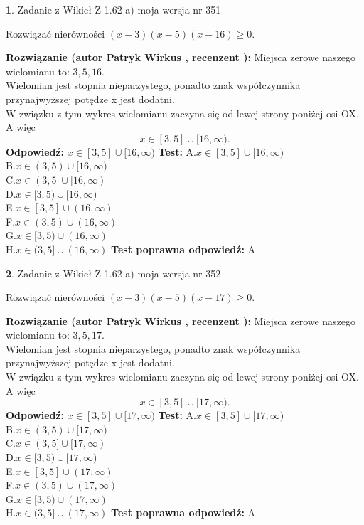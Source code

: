 \documentclass[12pt, a4paper]{article}
\theoremstyle{definition} %
\newtheorem{zad}{}
\newcommand{\zadStart}[1]{\begin{zad}#1\newline}
\newcommand{\zadStop}{\end{zad}}
\newcommand{\rozwStart}[2]{\noindent \textbf{Rozwiązanie (autor #1 , recenzent #2): }\newline}
\newcommand{\rozwStop}{\newline}
\newcommand{\odpStart}{\noindent \textbf{Odpowiedź:}\newline}
\newcommand{\odpStop}{\newline}
\newcommand{\testStart}{\noindent \textbf{Test:}\newline}
\newcommand{\testStop}{\newline}
\newcommand{\kluczStart}{\noindent \textbf{Test poprawna odpowiedź:}\newline}
\newcommand{\kluczStop}{\newline}
\begin{document}
\zadStart{Zadanie z Wikieł Z 1.62 a) moja wersja nr 351}

Rozwiązać nierówności $(x-3)(x-5)(x-16)\ge0$.
\zadStop
\rozwStart{Patryk Wirkus}{}
Miejsca zerowe naszego wielomianu to: $3, 5, 16$.\\
Wielomian jest stopnia nieparzystego, ponadto znak współczynnika przy\linebreak najwyższej potędze x jest dodatni.\\ W związku z tym wykres wielomianu zaczyna się od lewej strony poniżej osi OX. A więc $$x \in [3,5] \cup [16,\infty).$$
\rozwStop
\odpStart
$x \in [3,5] \cup [16,\infty)$
\odpStop
\testStart
A.$x \in [3,5] \cup [16,\infty)$\\
B.$x \in (3,5) \cup [16,\infty)$\\
C.$x \in (3,5] \cup [16,\infty)$\\
D.$x \in [3,5) \cup [16,\infty)$\\
E.$x \in [3,5] \cup (16,\infty)$\\
F.$x \in (3,5) \cup (16,\infty)$\\
G.$x \in [3,5) \cup (16,\infty)$\\
H.$x \in (3,5] \cup (16,\infty)$
\testStop
\kluczStart
A
\kluczStop



\zadStart{Zadanie z Wikieł Z 1.62 a) moja wersja nr 352}

Rozwiązać nierówności $(x-3)(x-5)(x-17)\ge0$.
\zadStop
\rozwStart{Patryk Wirkus}{}
Miejsca zerowe naszego wielomianu to: $3, 5, 17$.\\
Wielomian jest stopnia nieparzystego, ponadto znak współczynnika przy\linebreak najwyższej potędze x jest dodatni.\\ W związku z tym wykres wielomianu zaczyna się od lewej strony poniżej osi OX. A więc $$x \in [3,5] \cup [17,\infty).$$
\rozwStop
\odpStart
$x \in [3,5] \cup [17,\infty)$
\odpStop
\testStart
A.$x \in [3,5] \cup [17,\infty)$\\
B.$x \in (3,5) \cup [17,\infty)$\\
C.$x \in (3,5] \cup [17,\infty)$\\
D.$x \in [3,5) \cup [17,\infty)$\\
E.$x \in [3,5] \cup (17,\infty)$\\
F.$x \in (3,5) \cup (17,\infty)$\\
G.$x \in [3,5) \cup (17,\infty)$\\
H.$x \in (3,5] \cup (17,\infty)$
\testStop
\kluczStart
A
\kluczStop
\end{document}
